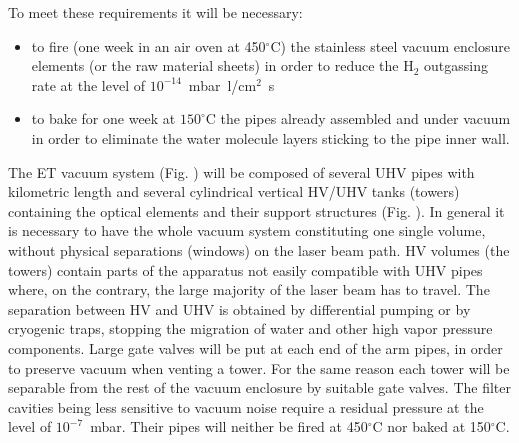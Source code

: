 To meet these requirements it will be necessary: 
\begin{itemize} 
\item to fire (one week in an air oven at 450$^\circ$C) the stainless steel vacuum enclosure elements (or the raw material sheets) in order to reduce the H$_2$ outgassing rate at the level of $10^{-14}$~mbar~l/cm$^{2}$~s 
\item to bake for one week at $150^\circ$C the pipes already assembled and under vacuum in order to eliminate the water molecule layers sticking to the pipe inner wall. 
\end{itemize} 


The ET vacuum system (Fig. 
) 
will be composed of several UHV pipes with kilometric length and several cylindrical vertical HV/UHV tanks (towers) containing the optical elements and their support structures (Fig. 
). In general it is necessary to have the whole vacuum system constituting one single volume, without physical separations (windows) on the laser beam path. HV volumes (the towers) contain parts of the apparatus not easily compatible with UHV pipes where, on the contrary, the large majority of the laser beam has to travel. The separation between HV and UHV is obtained by differential pumping or by cryogenic traps, stopping the migration of water and other high vapor pressure components. Large gate valves will be put at each end of the arm pipes, in order to preserve vacuum when venting a tower. For the same reason each tower will be separable from the rest of the vacuum enclosure by suitable gate valves. The filter cavities being less sensitive to vacuum noise require a residual pressure at the level of $10^{-7}$~mbar. Their pipes will neither be fired at 450$^\circ$C nor baked at 150$^\circ$C. 


